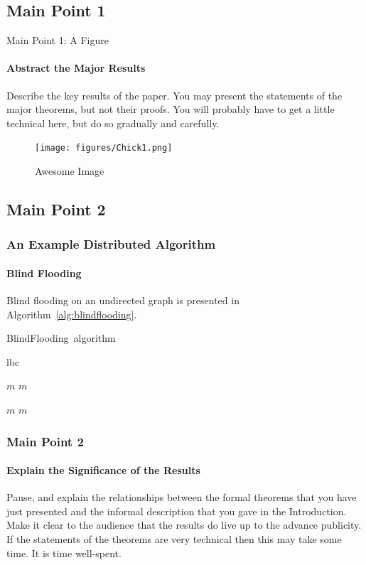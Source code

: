 \documentclass[11pt]{beamer}              %
\begin{document}
\subsection{Main Point 1}
\begin{frame}{Main Point 1: A Figure}
\framesubtitle{Abstract the Major Results}
Describe the key results of the paper. You may present the statements of the major theorems, but not their proofs. You will probably have to get a little technical here, but do so gradually and carefully.

\begin{figure}
    \centering
    \texttt{[image: figures/Chick1.png]}
    \caption{Awesome Image}
    \label{fig:awesome_image}
\end{figure}
\note{
}
\end{frame}


\subsection{Main Point 2}

\begin{frame}
\frametitle{An Example Distributed Algorithm}
\framesubtitle{Blind Flooding}


Blind flooding on an undirected graph is presented in Algorithm~\ref{alg:blindflooding}.

\begin{center}
\begin{algorithm}[H]
	\scriptsize
	\def\algorithmlabel{BlindFlooding}
    \caption{\algorithmlabel\ algorithm}
    \label{alg:blindflooding}
    \begin{algorithmic}[1]
    	\Implement {\algorithmlabel}{cf} 
    	 {lbc} 
	\Need {}

        		
         { $m$ }
        		 { $m$  }
        		
         { $m$ }	
        		 { $m$  }
    \end{algorithmic}
\end{algorithm}
\end{center}


\end{frame}

\begin{frame}
\frametitle{Main Point 2}
\framesubtitle{Explain the Significance of the Results}
Pause, and explain the relationships between the formal theorems that you have just presented and the informal description that you gave in the Introduction. Make it clear to the audience that the results do live up to the advance publicity. If the statements of the theorems are very technical then this may take some time. It is time well-spent.

\end{frame}
\end{document}
